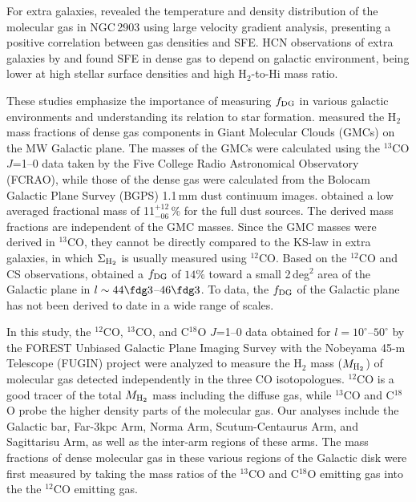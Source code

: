 \documentclass[proof]{pasj01}
\begin{document}
For extra galaxies, \citet{mur2016} revealed the temperature and density distribution of the molecular gas in NGC\,2903 using large velocity gradient analysis, presenting a positive correlation between gas densities and SFE.
HCN observations of extra galaxies by \citet{use2015} and \citet{big2016} found SFE in dense gas to depend on galactic environment, being lower at high stellar surface densities and high H$_2$-to-H{\sc i} mass ratio.

These studies emphasize the importance of measuring $f_{\rm DG}$ in various galactic environments and understanding its relation to star formation.
\citet{bat2014} measured the H$_2$ mass fractions of dense gas components in Giant Molecular Clouds (GMCs) on the MW Galactic plane. The masses of the GMCs were calculated using the $^{13}$CO $J$=1--0 data taken by the Five College Radio Astronomical Observatory (FCRAO), while those of the dense gas were calculated from the Bolocam Galactic Plane Survey (BGPS) 1.1\,mm dust continuum images. 
\citet{bat2014} obtained a low averaged fractional mass of 11$^{+12}_{-06}\,\%$ for the full dust sources.
The derived mass fractions are independent of the GMC masses.
Since the GMC masses were derived in $^{13}$CO, they cannot be directly compared to the KS-law in extra galaxies, in which $\Sigma_{\rm H_2}$ is usually measured using $^{12}$CO.
Based on the $^{12}$CO and CS observations, \citet{rom2016} obtained a $f_{\rm DG}$ of $14\%$ toward a small 2\,deg$^2$ area of the Galactic plane in $l\sim44\fdg3$--$46\fdg3$.
To data, the $f_{\rm DG}$ of the Galactic plane has not been derived to date in a wide range of scales.

In this study, the $^{12}$CO, $^{13}$CO, and C$^{18}$O $J$=1--0 data obtained for $l=10^\circ$--$50^\circ$ by the FOREST Unbiased Galactic Plane Imaging Survey with the Nobeyama 45-m Telescope (FUGIN) project \citep{ume2017} were analyzed to measure the H$_2$ mass ($M_{\rm H_2}$) of molecular gas detected independently in the three CO isotopologues.
$^{12}$CO is a good tracer of the total $M_{\rm H_2}$ mass including the diffuse gas, while $^{13}$CO and C$^{18}$O probe the higher density parts of the molecular gas.
Our analyses include the Galactic bar, Far-3kpc Arm, Norma Arm, Scutum-Centaurus Arm, and Sagittarisu Arm, as well as the inter-arm regions of these arms.
The mass fractions of dense molecular gas in these various regions of the Galactic disk were first measured by taking the mass ratios of the $^{13}$CO and C$^{18}$O emitting gas into the the $^{12}$CO emitting gas.
\end{document}
